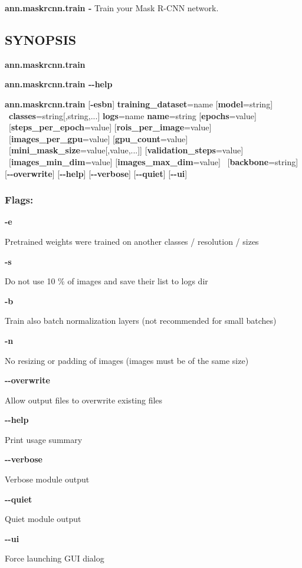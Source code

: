 \textbf{ann.maskrcnn.train -} Train your Mask R-CNN network.

\subsection*{SYNOPSIS}

\begin{flushleft}
\textbf{ann.maskrcnn.train} 

\textbf{ann.maskrcnn.train -{}-help}

\textbf{ann.maskrcnn.train} [\textbf{-esbn}] \textbf{training\_dataset}=name [\textbf{model}=string] \tab\ \textbf{classes}=string[,string,...] \textbf{logs}=name \textbf{name}=string [\textbf{epochs}=value] \tab\ [\textbf{steps\_per\_epoch}=value] [\textbf{rois\_per\_image}=value] \tab\ [\textbf{images\_per\_gpu}=value] [\textbf{gpu\_count}=value] \tab\ [\textbf{mini\_mask\_size}=value[,value,...]] [\textbf{validation\_steps}=value] \tab\ [\textbf{images\_min\_dim}=value] [\textbf{images\_max\_dim}=value] \tab\ [\textbf{backbone}=string] [\textbf{-{}-overwrite}] [\textbf{-{}-help}] [\textbf{-{}-verbose}] [\textbf{-{}-quiet}] [\textbf{-{}-ui}]
\end{flushleft}

\subsubsection*{Flags:}
\begin{flushleft}
  \textbf{-e}
  
  \tab Pretrained weights were trained on another classes / resolution / sizes
  
  \textbf{-s}
  
  \tab Do not use 10 \% of images and save their list to logs dir
  
  \textbf{-b}
  
  \tab Train also batch normalization layers (not recommended for small batches)

  \textbf{-n}
  
  \tab No resizing or padding of images (images must be of the same size)
  
  \textbf{-{}-overwrite}
  
  \tab Allow output files to overwrite existing files
  
  \textbf{-{}-help}
  
  \tab Print usage summary
  
  \textbf{-{}-verbose}
  
  \tab Verbose module output
  
  \textbf{-{}-quiet}
  
  \tab Quiet module output
  
  \textbf{-{}-ui}
  
  \tab Force launching GUI dialog
\end{flushleft}

